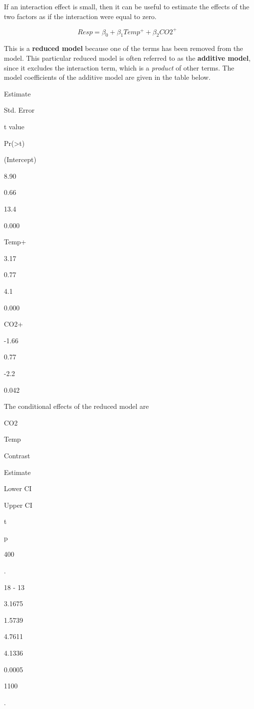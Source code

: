 \documentclass[]{book}
\begin{document}
If an interaction effect is small, then it can be useful to estimate the effects of the two factors as if the interaction were equal to zero.

\begin{equation}
Resp = \beta_0 + \beta_1Temp^+ + \beta_2CO2^+
\end{equation}

This is a \textbf{reduced model} because one of the terms has been removed from the model. This particular reduced model is often referred to as the \textbf{additive model}, since it excludes the interaction term, which is a \emph{product} of other terms. The model coefficients of the additive model are given in the table below.

Estimate

Std. Error

t value

Pr(\textgreater\textbar t\textbar)

(Intercept)

8.90

0.66

13.4

0.000

Temp+

3.17

0.77

4.1

0.000

CO2+

-1.66

0.77

-2.2

0.042

The conditional effects of the reduced model are

CO2

Temp

Contrast

Estimate

Lower CI

Upper CI

t

p

400

.

18 - 13

3.1675

1.5739

4.7611

4.1336

0.0005

1100

.
\end{document}
